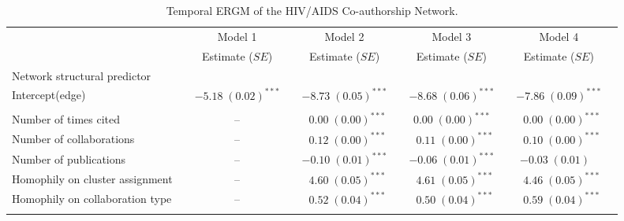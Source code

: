 \begin{table}
\begin{center}
\caption{Temporal ERGM of the HIV/AIDS Co-authorship Network.}
\label{tab:hiv_tergm}
\hspace*{-1cm}
\scriptsize
\begin{tabular}{@{}lcclclclcl@{}}
        \toprule
           &  & Model 1 &  & Model 2  &  & Model 3&  & Model 4\\ \cmidrule{3-3} \cmidrule{5-5} \cmidrule{7-7} \cmidrule{9-9}
           &  & Estimate ($SE$) &  & Estimate ($SE$)  &  & Estimate ($SE$) &  & Estimate ($SE$)\\
\midrule
Network structural predictor & & & & & & & & \\
\hspace{10pt}Intercept(edge)    &  & $-5.18 \; (0.02)^{***}$ &  & $-8.73 \; (0.05)^{***}$ &  & $-8.68 \; (0.06)^{***}$ &  & $-7.86 \; (0.09)^{***}$ \\\\
Number of times cited             &  &       --              &  & $\hspace{6pt}0.00 \; (0.00)^{***}$  &  & $0.00 \; (0.00)^{***}$  &  & $\hspace{6pt}0.00 \; (0.00)^{***}$  \\
Number of collaborations                 &  &         --            &  & $\hspace{6pt}0.12 \; (0.00)^{***}$  &  & $\hspace{6pt}0.11 \; (0.00)^{***}$  &  & $\hspace{6pt}0.10 \; (0.00)^{***}$  \\
Number of publications                 &  &            --         &  & $-0.10 \; (0.01)^{***}$ &  & $-0.06 \; (0.01)^{***}$ &  & $-0.03 \; (0.01)^{~~~~}$       \\
Homophily on cluster assignment            &  &        --             &  & $\hspace{6pt}4.60 \; (0.05)^{***}$  &  & $\hspace{6pt}4.61 \; (0.05)^{***}$  &  & $\hspace{6pt}4.46 \; (0.05)^{***}$  \\
Homophily on collaboration type           &  &          --           &  & $\hspace{6pt}0.52 \; (0.04)^{***}$  &  & $\hspace{6pt}0.50 \; (0.04)^{***}$  &  & $\hspace{6pt}0.59 \; (0.04)^{***}$  \\\\

\end{tabular}
\end{center}
\end{table}
